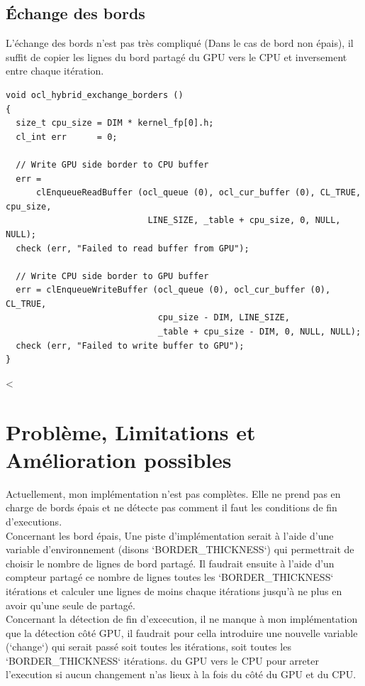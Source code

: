 \documentclass[a4paper,12pt]{article}
\begin{document}
\newpage
\subsection{Échange des bords}
L'échange des bords n'est pas très compliqué (Dans le cas de bord non épais), il suffit de copier les lignes du bord partagé du GPU vers le CPU et inversement entre chaque itération.
\begin{lstlisting}[style=cstyle, caption=Echange des bords]
void ocl_hybrid_exchange_borders ()
{
  size_t cpu_size = DIM * kernel_fp[0].h;
  cl_int err      = 0;

  // Write GPU side border to CPU buffer
  err =
      clEnqueueReadBuffer (ocl_queue (0), ocl_cur_buffer (0), CL_TRUE, cpu_size,
                            LINE_SIZE, _table + cpu_size, 0, NULL, NULL);
  check (err, "Failed to read buffer from GPU");

  // Write CPU side border to GPU buffer
  err = clEnqueueWriteBuffer (ocl_queue (0), ocl_cur_buffer (0), CL_TRUE,
                              cpu_size - DIM, LINE_SIZE,
                              _table + cpu_size - DIM, 0, NULL, NULL);
  check (err, "Failed to write buffer to GPU");
}
\end{lstlisting}

\newpage<
\section{Problème, Limitations et Amélioration possibles}

Actuellement, mon implémentation n'est pas complètes. Elle ne prend pas en charge de bords épais et ne détecte pas comment il faut les conditions de fin d'executions.\\
Concernant les bord épais, Une piste d'implémentation serait à l'aide d'une variable d'environnement (disons `BORDER\_THICKNESS`) qui permettrait de choisir le nombre de lignes de bord partagé. Il faudrait ensuite à l'aide d'un compteur partagé ce nombre de lignes toutes les `BORDER\_THICKNESS` itérations et calculer une lignes de moins chaque itérations jusqu'à ne plus en avoir qu'une seule de partagé.\\
Concernant la détection de fin d'excecution, il ne manque à mon implémentation que la détection côté GPU, il faudrait pour cella introduire une nouvelle variable (`change`) qui serait passé soit toutes les itérations, soit toutes les `BORDER\_THICKNESS` itérations. du GPU vers le CPU pour arreter l'execution si aucun changement n'as lieux à la fois du côté du GPU et du CPU.\\
\vskip 1cm
\end{document}
